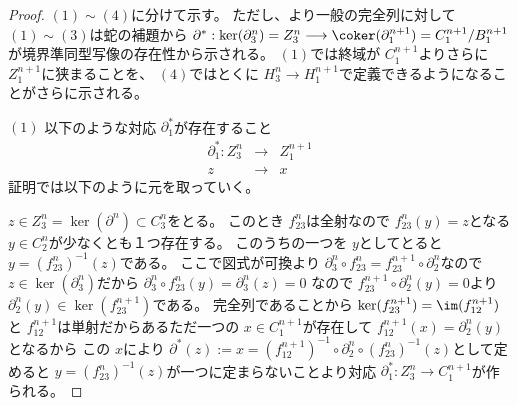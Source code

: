 \documentclass[../master_galois_theory]{subfiles}
\begin{document}
\begin{proof}
  $(1) \sim (4)$に分けて示す。
  ただし、より一般の完全列に対して $(1) \sim (3)$は蛇の補題から $\partial^* : \ker(\partial^n_3) = Z^n_3 \longrightarrow \coker(\partial^{n+1}_1) = C^{n+1}_1 / B^{n+1}_1$が境界準同型写像の存在性から示される。
  $(1)$では終域が $C^{n+1}_1$よりさらに $Z^{n+1}_1$に狭まることを、
  $(4)$ではとくに $H^n_3 \longrightarrow H^{n+1}_1$で定義できるようになることがさらに示される。

  $(1)$
  以下のような対応 $\partial^*_1$が存在すること
  \begin{eqnarray*}
    \partial^*_1 : Z^n_3 & \longrightarrow & Z^{n+1}_1 \\
    z & \longrightarrow & x
  \end{eqnarray*}
  証明では以下のように元を取っていく。
  \begin{center}
  \end{center}

  $z \in Z^n_3 = \ker(\partial^n) \subset C^n_3$をとる。
  このとき $f_{23}^n$は全射なので $f_{23}^n(y) = z$となる $y \in C^n_2$が少なくとも１つ存在する。
  このうちの一つを $y$としてとると $y = (f_{23}^n)^{-1}(z)$である。
  ここで図式が可換より $\partial^n_3 \circ f_{23}^n = f_{23}^{n+1} \circ \partial^n_2$なので
  $z \in \ker(\partial^n_3)$だから
  $\partial^n_3 \circ f_{23}^n(y) = \partial^n_3(z) = 0$
  なので $f_{23}^{n+1} \circ \partial^n_2(y) = 0$より $\partial^n_2(y) \in \ker(f_{23}^{n+1})$である。
  完全列であることから $\ker(f_{23}^{n+1}) = \im(f_{12}^{n+1})$と
  $f_{12}^{n+1}$は単射だからあるただ一つの $x \in C^{n+1}_1$が存在して
  $f_{12}^{n+1}(x) = \partial^n_2(y)$となるから
  この $x$により $\partial^*(z) := x = (f_{12}^{n+1})^{-1} \circ \partial^n_2 \circ (f_{23}^n)^{-1}(z)$として定めると
  $y = (f_{23}^n)^{-1}(z)$が一つに定まらないことより対応 $\partial^*_1 : Z^n_3 \longrightarrow C^{n+1}_1$が作られる。


\end{proof}
\end{document}
